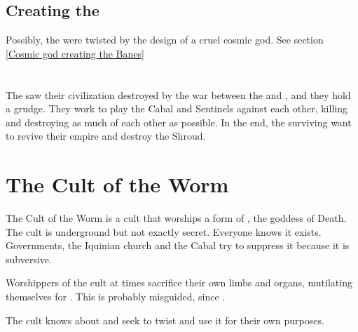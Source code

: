 \subsection{Creating the \banes}
Possibly, the \banes{} were twisted by the design of a cruel cosmic god. See section \ref{Cosmic god creating the Banes}















\section{\Cuezca}
\label{\Cuezcan}
\label{\Cuezcans}
The \cuezcans{} saw their civilization destroyed by the war between the \dragons{} and \banes{}, and they hold a grudge. They work to play the Cabal and Sentinels against each other, killing and destroying as much of each other as possible. In the end, the surviving \cuezcans{} want to revive their empire and destroy the Shroud. 


















\section{The Cult of the Worm}
\label{Cult of the Worm}
The Cult of the Worm is a cult that worships a form of \hs{\KhothSell}, the \firstgendragon{} goddess of Death. The cult is underground but not exactly secret. Everyone knows it exists. Governments, the Iquinian church and the Cabal try to suppress it because it is subversive. 

Worshippers of the cult at times sacrifice their own limbs and organs, mutilating themselves for . This is probably misguided, since . 

The cult knows about  and seek to twist and use it for their own purposes. 









